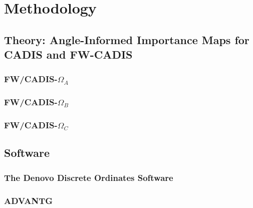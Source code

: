 \chapter{Methodology}

\section{Theory: Angle-Informed Importance Maps for CADIS and FW-CADIS}
\subsection{FW/CADIS-$\Omega_A$}
\subsection{FW/CADIS-$\Omega_B$}
\subsection{FW/CADIS-$\Omega_C$}
\section{Software}
\subsection{The Denovo Discrete Ordinates Software}
\subsection{ADVANTG}

